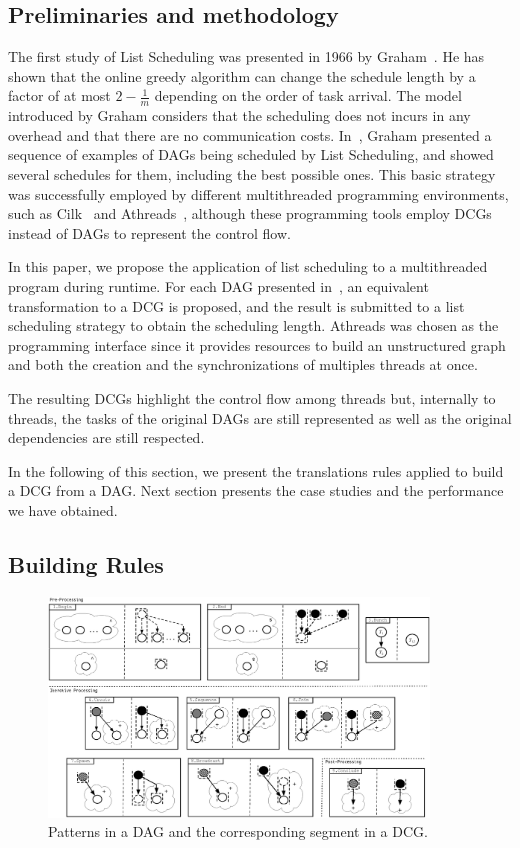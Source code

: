 \documentclass[twocolumn]{svjour3}
\begin{document}
\subsection{Preliminaries and methodology}

The first study of List Scheduling was presented in 1966 by Graham~\cite{Graham66}. He has shown that the online greedy algorithm can change the schedule length by a factor of at most $2 - \frac{1}{m}$ depending on the order of task arrival. The model introduced by Graham considers that the scheduling does not incurs in any overhead and that there are no communication costs. In~\cite{Graham76}, Graham presented a sequence of examples of DAGs being scheduled by List Scheduling, and showed several schedules for them, including the best possible ones. This basic strategy was successfully employed by different multithreaded programming environments, such as Cilk~\cite{Cilk95} and Athreads~\cite{cordeiro2005}, although these programming tools employ DCGs instead of DAGs to represent the control flow.

In this paper, we propose the application of list scheduling to a multithreaded program during runtime. For each DAG presented in~\cite{Graham76}, an equivalent transformation to a DCG is proposed, and the result is submitted to a list scheduling strategy to obtain the scheduling length. Athreads was chosen as the programming interface since it provides resources to build an unstructured graph and both the creation and the synchronizations of multiples threads at once.

The resulting DCGs highlight the control flow among threads but, internally to threads, the tasks of the original DAGs are still represented as well as the original dependencies are still respected.

In the following of this section, we present the translations rules applied to build a DCG from a DAG. Next section presents the case studies and the performance we have obtained.

\subsection{Building Rules}

\begin{figure}[htb]
\begin{center}
\includegraphics[width=0.9\textwidth,angle=0]{figs/shapes_definitivo.eps}
\caption{Patterns in a DAG and the corresponding segment in a DCG.}
\label{fig:shapes}
\end{center}
\end{figure}
\end{document}
